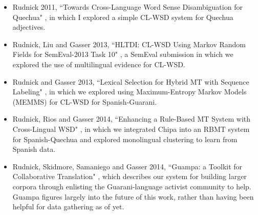 \begin{itemize}
\item Rudnick 2011, ``Towards Cross-Language Word Sense Disambiguation for
Quechua" \cite{rudnick:2011:RANLPStud}, in which I explored a simple CL-WSD
system for Quechua adjectives.
\item Rudnick, Liu and Gasser 2013, ``HLTDI: CL-WSD Using Markov Random Fields
for SemEval-2013 Task 10" \cite{rudnick-liu-gasser:2013:SemEval-2013}, a
SemEval submission in which we explored the use of multilingual evidence for
CL-WSD.
\item Rudnick and Gasser 2013, ``Lexical Selection for Hybrid MT with Sequence
Labeling" \cite{rudnick-gasser:2013:HyTra}, in which we explored using
Maximum-Entropy Markov Models (MEMMS) for CL-WSD for Spanish-Guarani.
\item Rudnick, Rios and Gasser 2014, ``Enhancing a Rule-Based MT System with
Cross-Lingual WSD" \cite{rudnick:saltmil2014}, in which we integrated Chipa
into an RBMT system for Spanish-Quechua and explored monolingual clustering to
learn from Spanish data.
\item Rudnick, Skidmore, Samaniego and Gasser 2014, ``Guampa: a Toolkit for
Collaborative Translation" \cite{RUDNICK14.151}, which describes our system for
building larger corpora through enlisting the Guarani-language activist
community to help. Guampa figures largely into the future of this work, rather
than having been helpful for data gathering as of yet.
\end{itemize}
